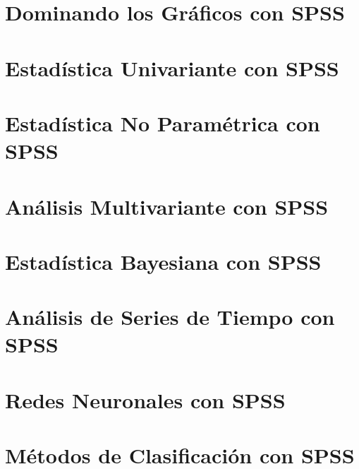 \documentclass[
  letterpaper,
  DIV=11,
  numbers=noendperiod]{scrreprt}
\begin{document}

\chapter{Dominando los Gráficos con
SPSS}\label{dominando-los-gruxe1ficos-con-spss}


\chapter{Estadística Univariante con
SPSS}\label{estaduxedstica-univariante-con-spss}


\chapter{Estadística No Paramétrica con
SPSS}\label{estaduxedstica-no-paramuxe9trica-con-spss}


\chapter{Análisis Multivariante con
SPSS}\label{anuxe1lisis-multivariante-con-spss}


\chapter{Estadística Bayesiana con
SPSS}\label{estaduxedstica-bayesiana-con-spss}


\chapter{Análisis de Series de Tiempo con
SPSS}\label{anuxe1lisis-de-series-de-tiempo-con-spss}


\chapter{Redes Neuronales con SPSS}\label{redes-neuronales-con-spss}


\chapter{Métodos de Clasificación con
SPSS}\label{muxe9todos-de-clasificaciuxf3n-con-spss}
\end{document}
